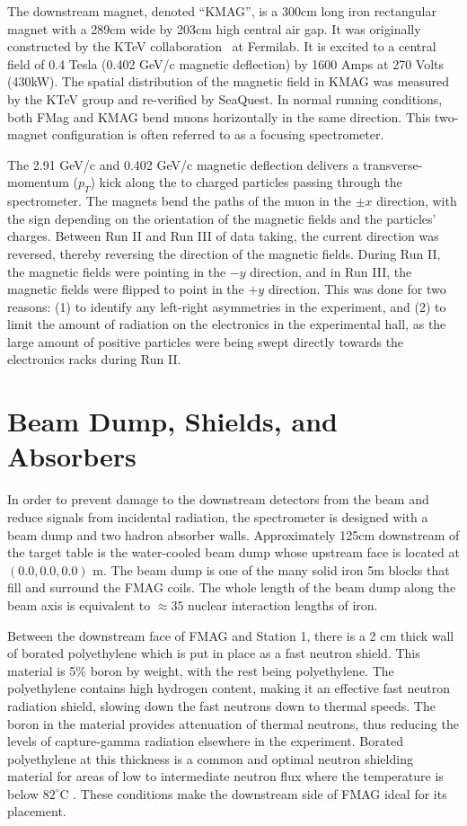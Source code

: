 The downstream magnet, denoted ``KMAG'', is a 300cm long iron rectangular magnet with a 289cm wide by 203cm high central air gap.  It was originally constructed by the KTeV collaboration~\cite{PhysRevD.67.012005} at Fermilab.  It is excited to a central field of 0.4 Tesla (0.402 GeV/c magnetic deflection) by 1600 Amps at 270 Volts (430kW).  The spatial distribution of the magnetic field in KMAG was measured by the KTeV group and re-verified by SeaQuest.  In normal running conditions, both FMag and KMAG bend muons horizontally in the same direction. This two-magnet configuration is often referred to as a focusing spectrometer.

The 2.91 GeV/c and 0.402 GeV/c magnetic deflection delivers a transverse-momentum ($p_T$) kick along the to charged particles passing through the spectrometer. The magnets bend the paths of the muon in the $\pm x$ direction, with the sign depending on the orientation of the magnetic fields and the particles' charges. Between Run II and Run III of data taking, the current direction was reversed, thereby reversing the direction of the magnetic fields. During Run II, the magnetic fields were pointing in the $-y$ direction, and in Run III, the magnetic fields were flipped to point in the $+y$ direction. This was done for two reasons: (1) to identify any left-right asymmetries in the experiment, and (2) to limit the amount of radiation on the electronics in the experimental hall, as the large amount of positive particles were being swept directly towards the electronics racks during Run II.

\section{Beam Dump, Shields, and Absorbers}

In order to prevent damage to the downstream detectors from the beam and reduce signals from incidental radiation, the spectrometer is designed with a beam dump and two hadron absorber walls. Approximately 125cm downstream of the target table
is the water-cooled beam dump whose upstream face is located at $(0.0, 0.0, 0.0)$ m. The beam dump is one of the many solid iron 5m blocks that fill and surround the FMAG coils. The whole length of the beam dump along the beam axis is equivalent to $\approx35$ nuclear interaction lengths of iron. 

Between the downstream face of FMAG and Station 1, there is a 2 cm thick wall of borated polyethylene which is put in place as a fast neutron shield. This material is 5\% boron by weight, with the rest being polyethylene. The polyethylene contains high hydrogen content, making it an effective fast neutron radiation shield, slowing down the fast neutrons down to thermal speeds. The boron in the material provides attenuation of thermal neutrons, thus reducing the levels of capture-gamma radiation elsewhere in the experiment. Borated polyethylene at this thickness is a common and optimal neutron shielding material for areas of low to intermediate neutron flux where the temperature is below $82^\circ$C \CN. These conditions make the downstream side of FMAG ideal for its placement.

